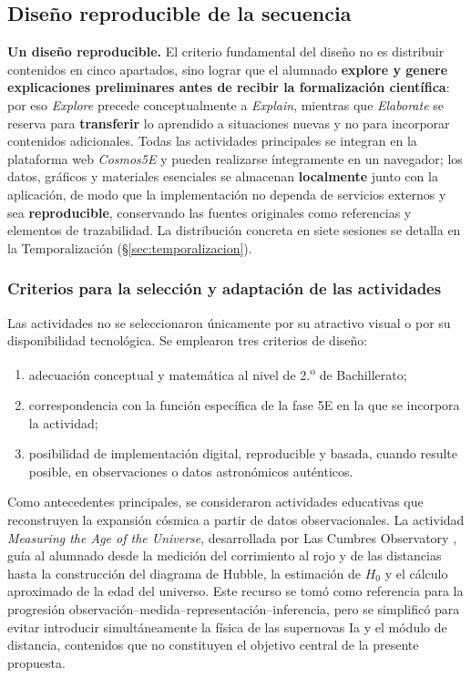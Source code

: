 \subsection{Diseño reproducible de la secuencia}\label{sec:diseno5e_reproducible}

\textbf{Un diseño reproducible.} El criterio fundamental del diseño no es distribuir contenidos en cinco apartados, sino lograr que el alumnado \textbf{explore y genere explicaciones preliminares antes de recibir la formalización científica}: por eso \textit{Explore} precede conceptualmente a \textit{Explain}, mientras que \textit{Elaborate} se reserva para \textbf{transferir} lo aprendido a situaciones nuevas y no para incorporar contenidos adicionales. Todas las actividades principales se integran en la plataforma web \textit{Cosmos5E} y pueden realizarse íntegramente en un navegador; los datos, gráficos y materiales esenciales se almacenan \textbf{localmente} junto con la aplicación, de modo que la implementación no dependa de servicios externos y sea \textbf{reproducible}, conservando las fuentes originales como referencias y elementos de trazabilidad. La distribución concreta en siete sesiones se detalla en la Temporalización (§\ref{sec:temporalizacion}).

\subsubsection{Criterios para la selección y adaptación de las actividades}

Las actividades no se seleccionaron únicamente por su atractivo visual o por su disponibilidad tecnológica. Se emplearon tres criterios de diseño:

\begin{enumerate}
    \item adecuación conceptual y matemática al nivel de 2.\textsuperscript{o} de Bachillerato;
    \item correspondencia con la función específica de la fase 5E en la que se incorpora la actividad;
    \item posibilidad de implementación digital, reproducible y basada, cuando resulte posible, en observaciones o datos astronómicos auténticos.
\end{enumerate}

Como antecedentes principales, se consideraron actividades educativas que reconstruyen la expansión cósmica a partir de datos observacionales. La actividad \textit{Measuring the Age of the Universe}, desarrollada por Las Cumbres Observatory \parencite{LCOAgeUniverse}, guía al alumnado desde la medición del corrimiento al rojo y de las distancias hasta la construcción del diagrama de Hubble, la estimación de $H_0$ y el cálculo aproximado de la edad del universo. Este recurso se tomó como referencia para la progresión observación--medida--representación--inferencia, pero se simplificó para evitar introducir simultáneamente la física de las supernovas Ia y el módulo de distancia, contenidos que no constituyen el objetivo central de la presente propuesta.

